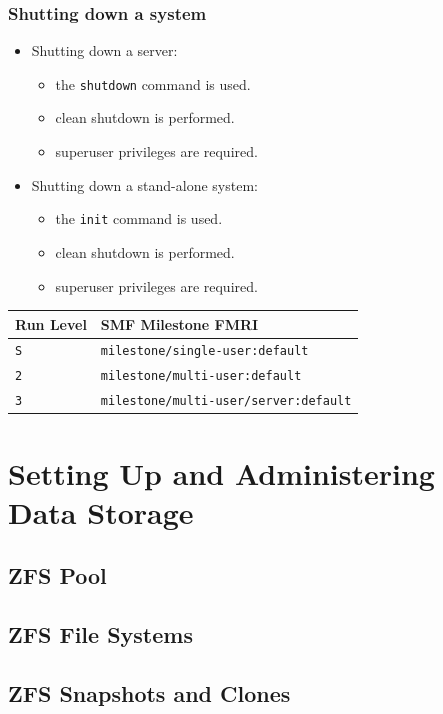 \documentclass[10pt,a4paper,twoside]{report}
\begin{document}
\subsection{Shutting down a system}
\begin{itemize}
\item Shutting down a server:
\begin{itemize}
\item the \verb+shutdown+ command is used.
\item clean shutdown is performed.
\item superuser privileges are required.
\end{itemize}
\item Shutting down a stand-alone system:
\begin{itemize}
\item the \verb+init+ command is used.
\item clean shutdown is performed.
\item superuser privileges are required.
\end{itemize}
\end{itemize}
\begin{table}
\begin{tabular}{|p{}|p{}|}
\hline
\rowcolor{LightBlue}
 \textbf{Run Level}& \textbf{SMF Milestone FMRI} \\
\hline
\rowcolor{LightYellow}
\verb+S+ & \verb+milestone/single-user:default+\\
\hline
\rowcolor{LightYellow}
\verb+2+ & \verb+milestone/multi-user:default+\\
 \hline
\rowcolor{LightYellow}
\verb+3+ & \verb+milestone/multi-user/server:default+\\
 \hline
\end{tabular}
\end{table}


\chapter{Setting Up and Administering Data Storage}
\section{ZFS Pool}
\section{ZFS File Systems}
\section{ZFS Snapshots and Clones}
\end{document}
